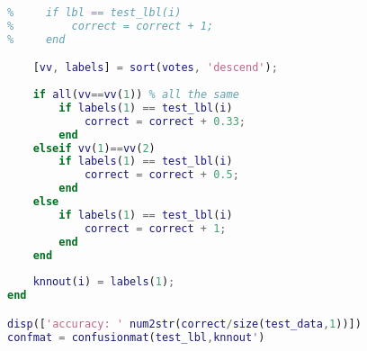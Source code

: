 \documentclass{article}
\begin{document}
\begin{lstlisting}[language=matlab]
%     [~,lbl] = max(votes);
%     if lbl == test_lbl(i)
%         correct = correct + 1;
%     end 

    [vv, labels] = sort(votes, 'descend');
    
    if all(vv==vv(1)) % all the same
        if labels(1) == test_lbl(i)
            correct = correct + 0.33;
        end
    elseif vv(1)==vv(2)
        if labels(1) == test_lbl(i)
            correct = correct + 0.5;
        end
    else
        if labels(1) == test_lbl(i)
            correct = correct + 1;
        end
    end
    
    knnout(i) = labels(1);   
end

disp(['accuracy: ' num2str(correct/size(test_data,1))])
confmat = confusionmat(test_lbl,knnout')


















\end{lstlisting}
\end{document}
